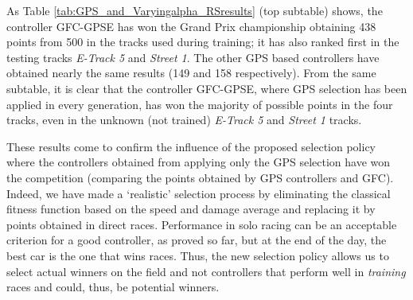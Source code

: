 \documentclass[10pt,journal,compsoc]{IEEEtran}
\begin{document}
%
As Table \ref{tab:GPS_and_Varyingalpha_RSresults} (top subtable)
shows, the controller {\sf GFC-GPSE} has won the Grand Prix
championship obtaining 438 points from 500 in the tracks used during
training; it has also ranked first in the testing tracks
\textit{E-Track 5} and \textit{Street 1}.
The other GPS based controllers have obtained nearly the same results (149 and 158 respectively).
From the same subtable, it is clear that the controller {\sf GFC-GPSE}, where GPS selection has been applied in every generation, has won the majority of possible points in the four tracks, even in the unknown (not trained) \textit{E-Track 5}  and \textit{Street 1} tracks.

These results come to confirm the influence of the proposed selection policy where the controllers obtained from applying only the GPS selection have won the competition (comparing the points obtained by GPS controllers and GFC).
Indeed, we have made a `realistic' selection process by eliminating
the classical fitness function based on the speed and damage average
and replacing it by points obtained in direct races. 
Performance in solo racing can be an acceptable criterion for a good
controller, as proved so far, but at the end of the day, the best car
is the one that wins races. Thus, the new selection policy allows us
to select actual winners on the field and not controllers that perform
well in {\em training} races and could, thus, be potential winners.

\end{document}
